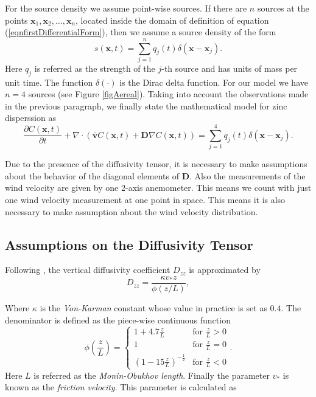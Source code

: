 \documentclass[12pt]{book}
\newcommand{\x}{\textbf{x}}
\newcommand{\vv}{\textbf{v}}
\newcommand{\dv}{\nabla\cdot}
\begin{document}
For the source density we assume point-wise sources. If there are $n$ sources 
 at the points $\x_{1},\x_{2},\ldots,\x_{n}$, located inside the domain of definition 
of equation (\ref{eqnfirstDifferentialForm}),
then we assume a source density of the form
\begin{equation}\label{eqnSourceDensity}
s(\x,t)=\sum_{j=1}^{n}q_{j}(t)\delta(\x-\x_{j}).
\end{equation}
Here $q_{j}$ is referred as the  strength of the $j$-th source and has units of mass per unit time. 
The function $\delta(\cdot)$ is the Dirac delta function. For our model we have $n=4$ sources 
(see Figure \ref{figAereal}). Taking into account the observations made in the 
previous paragraph, we finally state the mathematical model for zinc disperssion as
\begin{equation}\label{eqnDifussivityFinalForm}
\frac{\partial C(\x,t)}{\partial t}+\dv(\bar{\vv}C(\x,t)+\textbf{D}\nabla C(\x,t))=\sum_{j=1}^{4}q_{j}(t)\delta(\x-\x_{j}).
\end{equation}



Due to the presence of the diffusivity tensor, it is necessary to make assumptions about
the behavior of the diagonal elements of $\textbf{D}$. Also the measurements of the wind velocity 
are given by one 2-axis anemometer. This means we count with just one wind velocity measurement at
 one point in space. This means it is also necessary to make assumption about
the wind velocity distribution. 


\subsection{Assumptions on the Diffusivity Tensor}
Following \cite{monin1954basic},  the vertical diffusivity coefficient $D_{zz}$ is approximated by
\begin{equation}\label{eqnEddyVertical}
D_{zz}=\frac{\kappa v_{*} z}{\phi(z/L)},
\end{equation}

Where $\kappa$ is the \textit{Von-Karman} constant whose value in practice is set as $0.4$. The denominator
is defined as the piece-wise continuous function
\begin{equation*}
\phi\left(\frac{z}{L}\right)=\left\{
			\begin{array}{ll}				
				1+4.7\frac{z}{L} &\mbox{for }\frac{z}{L}>0 \\
				1 &\mbox{for }\frac{z}{L}=0\\
				(1-15\frac{z}{L})^{-\frac{1}{2}}&\mbox{for }\frac{z}{L}<0
			\end{array}.
		\right.
\end{equation*}
Here $L$ is referred as the \textit{Monin-Obukhov length}. Finally the parameter $v_{*}$ is known as 
the \textit{friction velocity}.  This parameter is calculated as 
\end{document}
